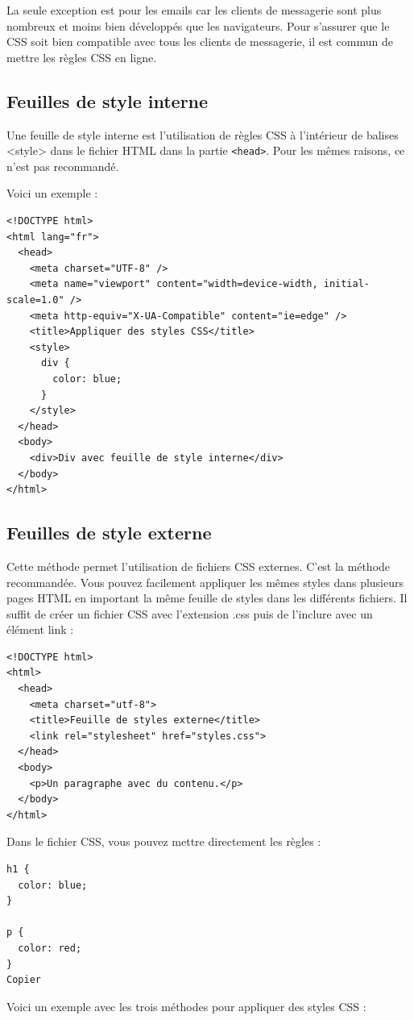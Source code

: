 \documentclass[a4paper]{article}
\begin{document}
La seule exception est pour les emails car les clients de messagerie sont plus nombreux et moins bien développés que les navigateurs. Pour s'assurer que le {\color{monOrange}CSS} soit bien compatible avec tous les clients de messagerie, il est commun de mettre les règles {\color{monOrange}CSS} en ligne.

\subsection{Feuilles de style interne}
Une feuille de style interne est l'utilisation de règles {\color{monOrange}CSS} à l'intérieur de balises <style> dans le fichier {\color{monOrange}HTML} dans la partie {\tt <head>}. Pour les mêmes raisons, ce n'est pas recommandé.

Voici un exemple :
\begin{verbatim}
<!DOCTYPE html>
<html lang="fr">
  <head>
    <meta charset="UTF-8" />
    <meta name="viewport" content="width=device-width, initial-scale=1.0" />
    <meta http-equiv="X-UA-Compatible" content="ie=edge" />
    <title>Appliquer des styles CSS</title>
    <style>
      div {
        color: blue;
      }
    </style>
  </head>
  <body>
    <div>Div avec feuille de style interne</div>
  </body>
</html>
\end{verbatim}
\subsection{Feuilles de style externe}
Cette méthode permet l'utilisation de fichiers {\color{monOrange}CSS} externes. C'est la méthode recommandée. Vous pouvez facilement appliquer les mêmes styles dans plusieurs pages {\color{monOrange}HTML} en important la même feuille de styles dans les différents fichiers. Il suffit de créer un fichier {\color{monOrange}CSS} avec l'extension {\color{monOrange}.css} puis de l'inclure avec un élément {\color{monOrange}link} :
\begin{verbatim}
<!DOCTYPE html>
<html>
  <head>
    <meta charset="utf-8">
    <title>Feuille de styles externe</title>
    <link rel="stylesheet" href="styles.css">
  </head>
  <body>
    <p>Un paragraphe avec du contenu.</p>
  </body>
</html>
\end{verbatim}
Dans le fichier CSS, vous pouvez mettre directement les règles :
\begin{verbatim}
h1 {
  color: blue;
}

p {
  color: red;
}
Copier
\end{verbatim}
Voici un exemple avec les trois méthodes pour appliquer des styles {\color{monOrange}CSS} :
\end{document}
